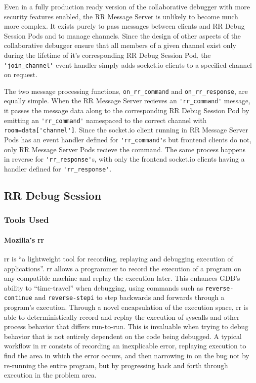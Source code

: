 \documentclass[12pt]{article}
\begin{document}
Even in a fully production ready version of the collaborative debugger
with more security features enabled, the RR Message Server is unlikely
to become much more complex.  It exists purely to pass messages
between clients and RR Debug Session Pods and to manage channels.
Since the design of other aspects of the collaborative debugger ensure
that all members of a given channel exist only during the lifetime of
it's corresponding RR Debug Session Pod, the
\lstinline{'join_channel'} event handler simply adds socket.io clients
to a specified channel on request.
\par

The two message processing functions, \lstinline{on_rr_command} and
\lstinline{on_rr_response}, are equally simple.  When the RR Message
Server recieves an \lstinline{'rr_command'} message, it passes the
message data along to the corresponding RR Debug Session Pod by
emitting an \lstinline{'rr_command'} namespaced to the correct channel
with \lstinline{room=data['channel']}.  Since the socket.io client
running in RR Message Server Pods has an event handler defined for
\lstinline{'rr_command'}s but frontend clients do not, only RR Message
Server Pods recieve the command.  The same process happens in reverse
for \lstinline{'rr_response'}s, with only the frontend socket.io
clients having a handler defined for \lstinline{'rr_response'}.

\subsection{RR Debug Session} \label{rrpods}

\subsubsection{Tools Used}

\paragraph{Mozilla's rr}\label{rr}

rr is ``a lightweight tool for recording, replaying and debugging
execution of applications''\cite{rr-repo}. rr allows a programmer to
record the execution of a program on any compatible machine and replay
the execution later.  This enhances GDB's ability to ``time-travel''
when debugging, using commands such as \lstinline{reverse-continue}
and \lstinline{reverse-stepi}\cite{gdbman} to step backwards and
forwards through a program's execution.  Through a novel encapsulation
of the execution space, rr is able to deterministically record and
replay the execution of syscalls and other process behavior that
differs run-to-run.  This is invaluable when trying to debug behavior
that is not entirely dependent on the code being debugged.  A typical
workflow in rr consists of recording an inexplicable error, replaying
execution to find the area in which the error occurs, and then
narrowing in on the bug not by re-running the entire program, but by
progressing back and forth through execution in the problem area.
\par
\end{document}
